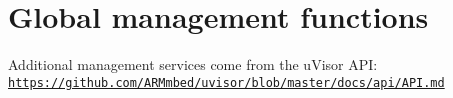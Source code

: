 \hypertarget{group__ssbx___main}{}\section{Global management functions}
\label{group__ssbx___main}
Additional management services come from the u\+Visor A\+PI\+: \href{https://github.com/ARMmbed/uvisor/blob/master/docs/api/API.md}{\tt https\+://github.\+com/\+A\+R\+Mmbed/uvisor/blob/master/docs/api/\+A\+P\+I.\+md} 